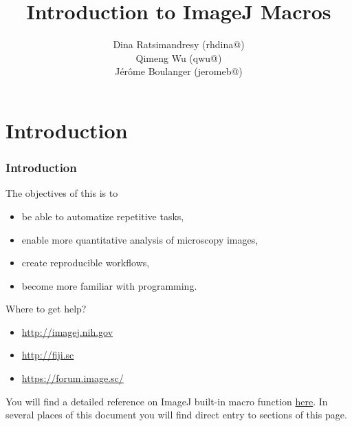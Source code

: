 \newcommand{\kw}[1]{\textcolor{orange}{\textbf{#1}}}
\newcommand{\code}[1] {\textcolor{gray}{\texttt{#1}}}
\setcounter{tocdepth}{1}
\title{Introduction to ImageJ Macros}
\author{Dina Ratsimandresy (rhdina@) \\ Qimeng Wu (qwu@) \\ J\'er\^ome Boulanger (jeromeb@)}
\date{}

\begin{frame}
  \maketitle
\end{frame}


\section{Introduction}
\begin{frame}
  \frametitle<presentation>{Introduction}
  The objectives of this  is to
  \begin{itemize}
    \item be able to automatize repetitive tasks,
    \item enable more quantitative analysis of microscopy images,
    \item create reproducible workflows,
    \item become more familiar with programming.
  \end{itemize}
  Where to get help?
  \begin{itemize}
    \item \url{http://imagej.nih.gov}
    \item \url{http://fiji.sc}
    \item \url{https://forum.image.sc/}
  \end{itemize}
\end{frame}

You will find a detailed reference on ImageJ built-in macro function
\href{http://rsb.info.nih.gov/ij/developer/macro/functions.html}{here}. In
several places of this document you will find direct entry to sections
of this page.

